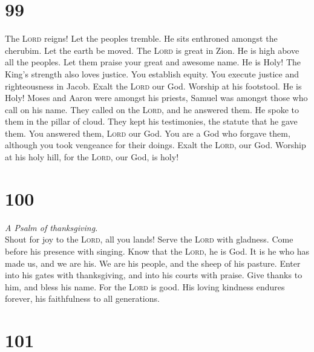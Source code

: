 \hypertarget{section-98}{%
\section{99}\label{section-98}}

 The \textsc{Lord} reigns! Let the peoples tremble. He
sits enthroned amongst the cherubim. Let the earth be moved.
 The \textsc{Lord} is great in Zion. He is high above all
the peoples.  Let them praise your great and awesome name.
He is Holy!  The King's strength also loves justice. You
establish equity. You execute justice and righteousness in Jacob.
 Exalt the \textsc{Lord} our God. Worship at his
footstool. He is Holy!  Moses and Aaron were amongst his
priests, Samuel was amongst those who call on his name. They called on
the \textsc{Lord}, and he answered them.  He spoke to them
in the pillar of cloud. They kept his testimonies, the statute that he
gave them.  You answered them, \textsc{Lord} our God. You
are a God who forgave them, although you took vengeance for their
doings.  Exalt the \textsc{Lord}, our God. Worship at his
holy hill, for the \textsc{Lord}, our God, is holy!

\hypertarget{section-99}{%
\section{100}\label{section-99}}

\emph{A Psalm of thanksgiving.}\\
 Shout for joy to the \textsc{Lord}, all you lands!
 Serve the \textsc{Lord} with gladness. Come before his
presence with singing.  Know that the \textsc{Lord}, he is
God. It is he who has made us, and we are his. We are his people, and
the sheep of his pasture.  Enter into his gates with
thanksgiving, and into his courts with praise. Give thanks to him, and
bless his name.  For the \textsc{Lord} is good. His loving
kindness endures forever, his faithfulness to all generations.

\hypertarget{section-100}{%
\section{101}\label{section-100}}

